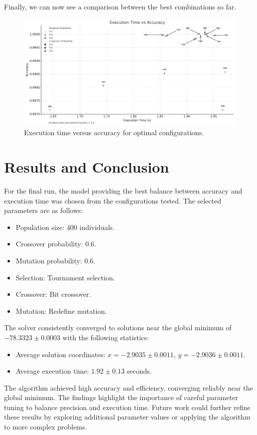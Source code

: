 \documentclass[11pt,a4paper,twoside]{article}
\begin{document}
Finally, we can now see a comparison between the best combinations so far.
\begin{figure}[H]
    \centering
    \includegraphics[width=\textwidth]{final.png}
    \caption{Execution time versus accuracy for optimal configurations.}
    \label{fig:final}
\end{figure}

\section{Results and Conclusion}

For the final run, the model providing the best balance between accuracy and execution time was chosen from the configurations tested. The selected parameters are as follows:

\begin{itemize} \item Population size: 400 individuals. \item Crossover probability: 0.6. \item Mutation probability: 0.6. \item Selection: Tournament selection. \item Crossover: Bit crossover. \item Mutation: Redefine mutation. \end{itemize}

The solver consistently converged to solutions near the global minimum of $-78.3323 \pm 0.0003$ with the following statistics: \begin{itemize} \item Average solution coordinates: $x = -2.9035 \pm 0.0011$, $y = -2.9036 \pm 0.0011$. \item Average execution time: $1.92 \pm 0.13$ seconds. \end{itemize} 

The algorithm achieved high accuracy and efficiency, converging reliably near the global minimum. The findings highlight the importance of careful parameter tuning to balance precision and execution time. Future work could further refine these results by exploring additional parameter values or applying the algorithm to more complex problems.
\end{document}
